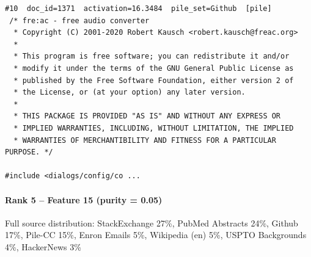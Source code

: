 \begin{verbatim}
#10  doc_id=1371  activation=16.3484  pile_set=Github  [pile]
 /* fre:ac - free audio converter
  * Copyright (C) 2001-2020 Robert Kausch <robert.kausch@freac.org>
  *
  * This program is free software; you can redistribute it and/or
  * modify it under the terms of the GNU General Public License as
  * published by the Free Software Foundation, either version 2 of
  * the License, or (at your option) any later version.
  *
  * THIS PACKAGE IS PROVIDED "AS IS" AND WITHOUT ANY EXPRESS OR
  * IMPLIED WARRANTIES, INCLUDING, WITHOUT LIMITATION, THE IMPLIED
  * WARRANTIES OF MERCHANTIBILITY AND FITNESS FOR A PARTICULAR PURPOSE. */

#include <dialogs/config/co ...

\end{verbatim}

\paragraph*{Rank 5 -- Feature 15 (purity = 0.05)}

Full source distribution: StackExchange 27\%, PubMed Abstracts 24\%, Github 17\%, Pile-CC 15\%, Enron Emails 5\%, Wikipedia (en) 5\%, USPTO Backgrounds 4\%, HackerNews 3\%


